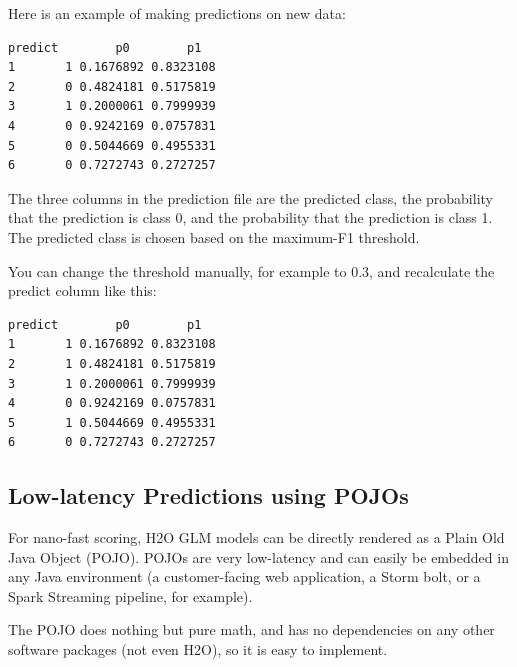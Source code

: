 \waterExampleInPython


\newpage
Here is an example of making predictions on new data:

\waterExampleInR


\waterExampleInPython

\begin{lstlisting}[style=output]
  predict        p0        p1
1       1 0.1676892 0.8323108
2       0 0.4824181 0.5175819
3       1 0.2000061 0.7999939
4       0 0.9242169 0.0757831
5       0 0.5044669 0.4955331
6       0 0.7272743 0.2727257
\end{lstlisting}


The three columns in the prediction file are the predicted class, the probability that the prediction is class 0,
and the probability that the prediction is class 1. The predicted class is chosen based on the maximum-F1 threshold.

You can change the threshold manually, for example to 0.3, and recalculate the predict column like this:



\begin{lstlisting}[style=output]
  predict        p0        p1
1       1 0.1676892 0.8323108
2       1 0.4824181 0.5175819
3       1 0.2000061 0.7999939
4       0 0.9242169 0.0757831
5       1 0.5044669 0.4955331
6       0 0.7272743 0.2727257
\end{lstlisting}

\subsection{Low-latency Predictions using POJOs}

For nano-fast scoring, H2O GLM models can be directly rendered as a Plain Old Java Object (POJO).  POJOs are very
low-latency and can easily be embedded in any Java environment (a customer-facing web application, a Storm bolt,
or a Spark Streaming pipeline, for example).

The POJO does nothing but pure math, and has no dependencies on any other software packages (not even H2O),
so it is easy to implement.

